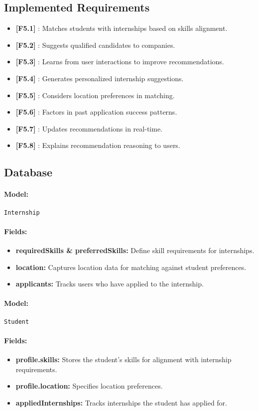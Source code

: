 \subsection*{Implemented Requirements}
\begin{itemize}
    \item \textbf{[F5.1]} : Matches students with internships based on skills alignment.
    \item \textbf{[F5.2]} : Suggests qualified candidates to companies.
    \item \textbf{[F5.3]} : Learns from user interactions to improve recommendations.
    \item \textbf{[F5.4]} : Generates personalized internship suggestions.
    \item \textbf{[F5.5]} : Considers location preferences in matching.
    \item \textbf{[F5.6]} : Factors in past application success patterns.
    \item \textbf{[F5.7]} : Updates recommendations in real-time.
    \item \textbf{[F5.8]} : Explains recommendation reasoning to users.
\end{itemize}

\subsection*{Database}
\paragraph{Model:} \texttt{Internship}
\paragraph{Fields:}
\begin{itemize}
    \item \textbf{requiredSkills \& preferredSkills:} Define skill requirements for internships.
    \item \textbf{location:} Captures location data for matching against student preferences.
    \item \textbf{applicants:} Tracks users who have applied to the internship.
\end{itemize}

\paragraph{Model:} \texttt{Student}
\paragraph{Fields:}
\begin{itemize}
    \item \textbf{profile.skills:} Stores the student's skills for alignment with internship requirements.
    \item \textbf{profile.location:} Specifies location preferences.
    \item \textbf{appliedInternships:} Tracks internships the student has applied for.
\end{itemize}

